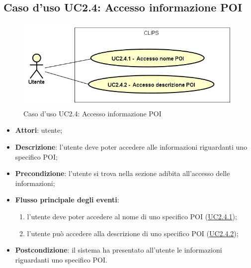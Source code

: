 \documentclass[../AnalisiDeiRequisiti.tex]{subfiles}
\begin{document}
\subsection{Caso d'uso UC2.4: Accesso informazione POI}

        \begin{figure}[H]
            \centering
            \includegraphics[scale=0.95, width=\textwidth]{img/UC2-4.png}
            \caption{Caso d'uso UC2.4: Accesso informazione POI}\label{fig:UC2.4} 
        \end{figure}
\begin{itemize}
\item \textbf{Attori}: utente;
\item \textbf{Descrizione}: l'utente deve poter accedere alle informazioni riguardanti uno specifico POI; 
      \item \textbf{Precondizione}: l'utente si trova nella sezione adibita all'accesso delle informazioni;

        \item \textbf{Flusso principale degli eventi}:
          \begin{enumerate}
          \item l'utente deve poter accedere al nome di uno specifico POI (\hyperlink{UC2.4.1}{UC2.4.1});
          \item l'utente può accedere alla descrizione di uno specifico POI (\hyperlink{UC2.4.2}{UC2.4.2});

      \end{enumerate}
    \item \textbf{Postcondizione}: il sistema ha presentato all'utente le informazioni riguardanti uno specifico POI.
  \end{itemize}
\hypertarget{UC2.4.1}{}
\end{document}
